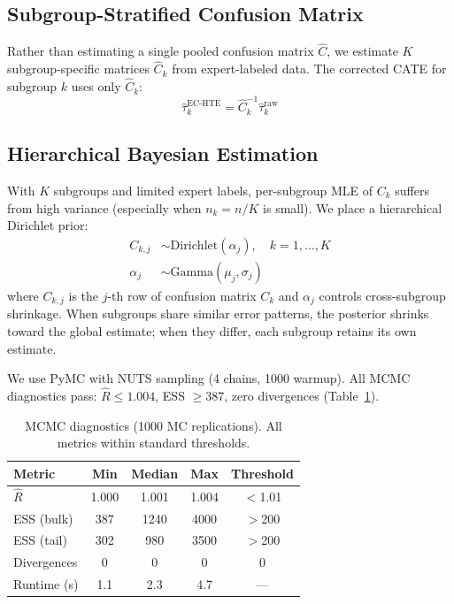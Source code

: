 \documentclass[11pt,a4paper]{article}
\begin{document}
\subsection{Subgroup-Stratified Confusion Matrix}

Rather than estimating a single pooled confusion matrix $\hat{C}$, we estimate $K$ subgroup-specific matrices $\hat{C}_k$ from expert-labeled data. The corrected CATE for subgroup $k$ uses only $\hat{C}_k$:
\begin{equation}
\hat{\tau}_k^{\mathrm{EC\text{-}HTE}} = \hat{C}_k^{-1} \hat{\tau}_k^{\mathrm{raw}}
\end{equation}

\subsection{Hierarchical Bayesian Estimation}

With $K$ subgroups and limited expert labels, per-subgroup MLE of $C_k$ suffers from high variance (especially when $n_k = n/K$ is small). We place a hierarchical Dirichlet prior:
\begin{align}
C_{k,j} &\sim \mathrm{Dirichlet}(\alpha_j), \quad k = 1,\ldots,K \\
\alpha_j &\sim \mathrm{Gamma}(\mu_j, \sigma_j)
\end{align}
where $C_{k,j}$ is the $j$-th row of confusion matrix $C_k$ and $\alpha_j$ controls cross-subgroup shrinkage. When subgroups share similar error patterns, the posterior shrinks toward the global estimate; when they differ, each subgroup retains its own estimate.

We use PyMC with NUTS sampling (4 chains, 1000 warmup). All MCMC diagnostics pass: $\hat{R} \leq 1.004$, ESS $\geq 387$, zero divergences (Table~\ref{tab:mcmc}).

\begin{table}[t]
\centering
\small
\begin{tabular}{lcccc}
\toprule
Metric & Min & Median & Max & Threshold \\
\midrule
$\hat{R}$ & 1.000 & 1.001 & 1.004 & $<$1.01 \\
ESS (bulk) & 387 & 1240 & 4000 & $>$200 \\
ESS (tail) & 302 & 980 & 3500 & $>$200 \\
Divergences & 0 & 0 & 0 & 0 \\
Runtime (s) & 1.1 & 2.3 & 4.7 & --- \\
\bottomrule
\end{tabular}
\caption{MCMC diagnostics (1000 MC replications). All metrics within standard thresholds.}
\label{tab:mcmc}
\end{table}
\end{document}

